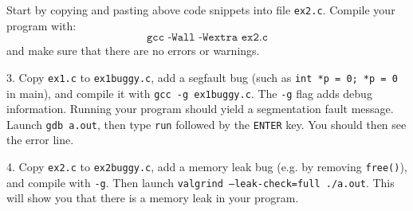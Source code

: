 \documentclass[a4paper,11pt]{article}
\begin{document}
Start by copying and pasting above code snippets into file \texttt{ex2.c}.
Compile your program with:
\[\texttt{gcc -Wall -Wextra ex2.c}\]
and make sure that there are no errors or warnings.


\linerule

3. Copy \texttt{ex1.c} to \texttt{ex1buggy.c}, 
add a segfault bug 
(such as \texttt{int *p = 0; *p = 0} in main),
and compile it with \texttt{gcc -g ex1buggy.c}.
The \texttt{-g} flag adds debug information. 
Running your program should yield a segmentation fault message.\\

Launch \texttt{gdb a.out}, then type \texttt{run} followed by the \texttt{ENTER} key. 
You should then see the error line.

\linerule

4. Copy \texttt{ex2.c} to \texttt{ex2buggy.c}, add a memory leak bug (e.g. by removing \texttt{free()}), and compile with \texttt{-g}. 
Then launch \texttt{valgrind --leak-check=full ./a.out}. 
This will show you that there is a memory leak in your program.
\end{document}
